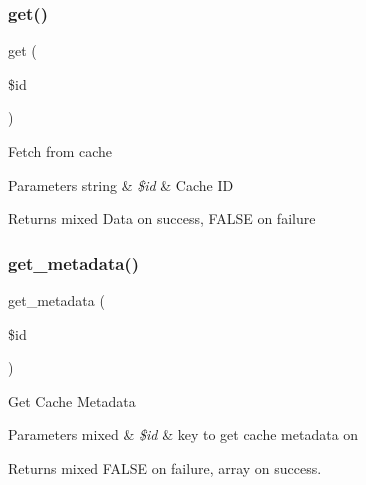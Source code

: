 \subsubsection{\texorpdfstring{get()}{get()}}
{\footnotesize\ttfamily get (\begin{DoxyParamCaption}\item[{}]{\$id }\end{DoxyParamCaption})}

Fetch from cache


\begin{DoxyParams}[1]{Parameters}
string & {\em \$id} & Cache ID \\
\hline
\end{DoxyParams}
\begin{DoxyReturn}{Returns}
mixed Data on success, F\+A\+L\+SE on failure 
\end{DoxyReturn}
\mbox{\label{class_c_i___cache__memcached_a59635cf18e997c5141bffa05ff7622e0}} 
\subsubsection{\texorpdfstring{get\+\_\+metadata()}{get\_metadata()}}
{\footnotesize\ttfamily get\+\_\+metadata (\begin{DoxyParamCaption}\item[{}]{\$id }\end{DoxyParamCaption})}

Get Cache Metadata


\begin{DoxyParams}[1]{Parameters}
mixed & {\em \$id} & key to get cache metadata on \\
\hline
\end{DoxyParams}
\begin{DoxyReturn}{Returns}
mixed F\+A\+L\+SE on failure, array on success. 
\end{DoxyReturn}
\mbox{\label{class_c_i___cache__memcached_a2f07a4e09b57f4460d49852497d1808f}} 
